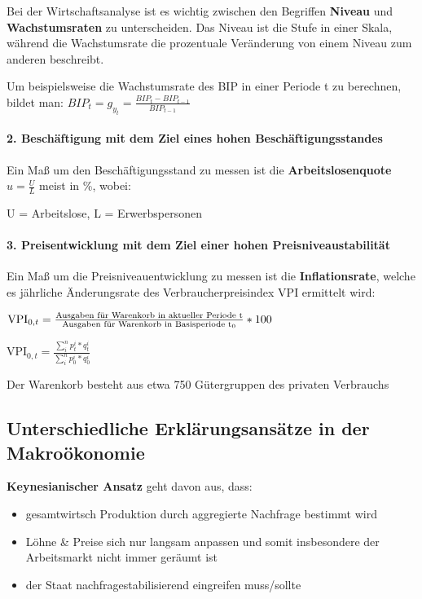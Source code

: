\documentclass[11pt]{article}
\begin{document}
Bei der Wirtschaftsanalyse ist es wichtig zwischen den Begriffen \textbf{Niveau} und \textbf{Wachstumsraten} zu unterscheiden. Das Niveau ist die Stufe in einer Skala, während die Wachstumsrate die prozentuale Veränderung von einem Niveau zum anderen beschreibt.

Um beispielsweise die Wachstumsrate des BIP in einer Periode t zu berechnen, bildet man: \(BIP_t = g_{y_t} = \frac{BIP_t - BIP_{t-1}}{BIP_{t-1}}\)

\paragraph{2. Beschäftigung mit dem Ziel eines hohen Beschäftigungsstandes}\mbox{}

Ein Maß um den Beschäftigungsstand zu messen ist die \textbf{Arbeitslosenquote} 
\(u = \frac{U}{L}\) meist in \%, wobei:

U = Arbeitslose,
L = Erwerbspersonen

\paragraph{3. Preisentwicklung mit dem Ziel einer hohen Preisniveaustabilität}\mbox{}

Ein Maß um die Preisniveauentwicklung zu messen ist die \textbf{Inflationsrate}, welche es jährliche Änderungsrate des Verbraucherpreisindex VPI ermittelt wird:

\(\text{VPI}_{0,t}=\frac{\text{Ausgaben für Warenkorb in aktueller Periode t}}{\text{Ausgaben für Warenkorb in Basisperiode t\textsubscript{0}}}*100\)

\(\text{VPI}_{0,t}=\frac{\sum_{i}^{n}{p_{t}^{i} * q_{t}^{i}}}{\sum_{i}^{n}{p_{0}^{i}*q_{0}^{i}}}\)

Der Warenkorb besteht aus etwa 750 Gütergruppen des privaten Verbrauchs

\subsection{Unterschiedliche Erklärungsansätze in der Makroökonomie}
\label{sec:orgee78f91}
\textbf{Keynesianischer Ansatz} geht davon aus, dass:
\begin{itemize}
\item gesamtwirtsch Produktion durch aggregierte Nachfrage bestimmt wird
\item Löhne \& Preise sich nur langsam anpassen und somit insbesondere der Arbeitsmarkt nicht immer geräumt ist
\item der Staat nachfragestabilisierend eingreifen muss/sollte
\end{itemize}
\end{document}
